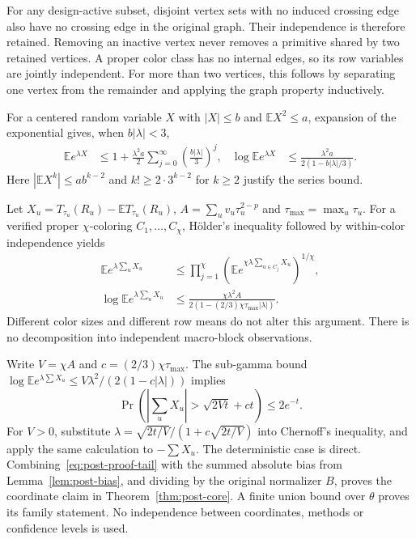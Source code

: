 For any design-active subset, disjoint vertex sets with no induced crossing
edge also have no crossing edge in the original graph. Their independence is
therefore retained. Removing an inactive vertex never removes a primitive
shared by two retained vertices. A proper color class has no internal edges,
so its row variables are jointly independent. For more than two vertices,
this follows by separating one vertex from the remainder and applying the
graph property inductively.

For a centered random variable $X$ with $|X|\leq b$ and
$\mathbb E X^2\leq a$, expansion of the exponential gives, when
$b|\lambda|<3$,
\begin{align}
 \mathbb E e^{\lambda X}
 &\leq 1+\frac{\lambda^2a}{2}
          \sum_{j=0}^\infty\left(\frac{b|\lambda|}{3}\right)^j,
 &\log\mathbb E e^{\lambda X}
 &\leq\frac{\lambda^2a}{2(1-b|\lambda|/3)}.
 \label{eq:post-proof-bernstein-mgf}
\end{align}
Here $|\mathbb E X^k|\leq ab^{k-2}$ and
$k!\geq 2\cdot 3^{k-2}$ for $k\geq 2$ justify the series bound.

Let $X_u=T_{\tau_u}(R_u)-\mathbb E T_{\tau_u}(R_u)$,
$A=\sum_uv_u\tau_u^{2-p}$ and $\tau_{\max}=\max_u\tau_u$.
For a verified proper $\chi$-coloring $C_1,\ldots,C_\chi$, H\"older's
inequality followed by within-color independence yields
\begin{align}
 \mathbb E e^{\lambda\sum_uX_u}
 &\leq\prod_{j=1}^\chi
    \left(\mathbb E e^{\chi\lambda\sum_{u\in C_j}X_u}\right)^{1/\chi},
 \nonumber\\
 \log\mathbb E e^{\lambda\sum_uX_u}
 &\leq\frac{\chi\lambda^2A}
              {2(1-(2/3)\chi\tau_{\max}|\lambda|)}.
 \label{eq:post-proof-graph-mgf}
\end{align}
Different color sizes and different row means do not alter this argument.
There is no decomposition into independent macro-block observations.

Write $V=\chi A$ and $c=(2/3)\chi\tau_{\max}$. The sub-gamma bound
$\log\mathbb E e^{\lambda\sum X_u}\leq
V\lambda^2/(2(1-c|\lambda|))$ implies
\begin{equation}
 \Pr\left(\left|\sum_uX_u\right|>
                \sqrt{2Vt}+ct\right)\leq 2e^{-t}.
 \label{eq:post-proof-tail}
\end{equation}
For $V>0$, substitute
$\lambda=\sqrt{2t/V}/(1+c\sqrt{2t/V})$ into Chernoff's inequality, and
apply the same calculation to $-\sum X_u$. The deterministic case is direct.
Combining~\eqref{eq:post-proof-tail} with the summed absolute bias from
Lemma~\ref{lem:post-bias}, and dividing by the original normalizer $B$, proves
the coordinate claim in Theorem~\ref{thm:post-core}. A finite union bound over
$\theta$ proves its family statement. No independence between coordinates,
methods or confidence levels is used.

